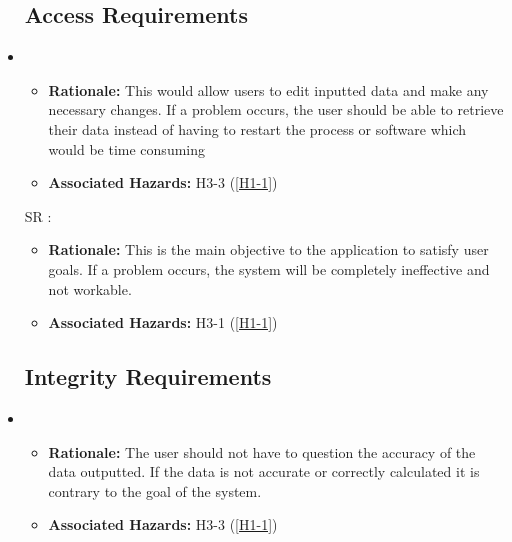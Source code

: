 \documentclass{article}
\newcounter{Sreqnum} %
\begin{document}
\begin{itemize} %
\subsection{Access Requirements}

\item[SR\refstepcounter{Sreqnum}\theSreqnum
\label{ACR1}:] 
\begin{itemize}
    \item \textbf{Rationale:} This would allow users to edit inputted data and make any necessary changes. If a problem occurs, the user should be able to retrieve their data instead of having to restart the process or software which would be time consuming
    \item \textbf{Associated Hazards: } H3-3 (\ref{H1-1})
\end{itemize}

\item[SR\refstepcounter{Sreqnum}\theSreqnum
\label{ACR2}:] 
\begin{itemize}
    \item \textbf{Rationale:} This is the main objective to the application to satisfy user goals. If a problem occurs, the system will be completely ineffective and not workable. 
    \item \textbf{Associated Hazards:} H3-1 (\ref{H1-1})
\end{itemize}

\subsection{Integrity Requirements}
\item[SR\refstepcounter{Sreqnum}\theSreqnum
\label{IR1}:] 
\begin{itemize}
    \item \textbf{Rationale:} The user should not have to question the accuracy of the data outputted. If the data is not accurate or correctly calculated it is contrary to the goal of the system. 
    \item \textbf{Associated Hazards:} H3-3 (\ref{H1-1})
\end{itemize}


\end{itemize}
\end{document}
